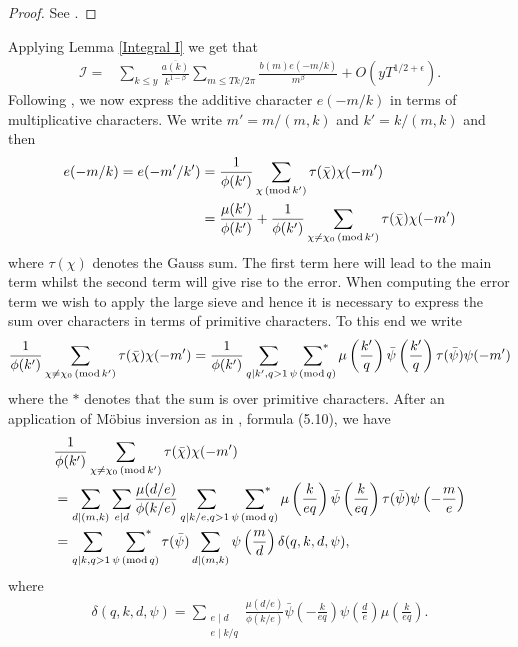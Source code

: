\documentclass[oneside, 12pt]{amsart}
\theoremstyle{definition}
\renewcommand{\pmod}[1]{\,(\textup{mod}\,#1)}
\newcommand{\mc}{\mathcal}
\newcommand{\ol}{\overline}
\newcommand{\leqs}{\leqslant }
\newcommand{\be}{\begin{equation*}}
\newcommand{\ee}{\end{equation*} }
\begin{document}
\begin{proof}
	 See \cite[Lemma 2]{CGGSimple}.
\end{proof}
Applying Lemma \ref{Integral I} we get that 
\be
\begin{split}
\mc{I} = & \sum_{k\leqs y}\frac{\ol{a(k)}}{k^{1-\beta}}\sum_{m\leqs Tk/2\pi}\frac{b(m)e(-m/k)}{m^\beta}
                +O(yT^{1/2+\epsilon}).
\end{split}
\ee
Following \cite{CGGSimple}, we now express the additive character $e(-m/k)$ in terms of multiplicative characters. We write $m'=m/(m,k)$ and $k'=k/(m,k)$ and then
\begin{align*}
e(-m/k)=e(-m'/k')&=\frac{1}{\phi(k')}\sum_{\chi \pmod {k'}}\tau(\bar{\chi})\chi(-m'	)\\&=\frac{\mu(k')}{\phi(k')}+ \frac{1}{\phi(k')}\sum_{\chi \not=\chi_0\pmod {k'}}\tau(\bar{\chi})\chi(-m')
\end{align*} 
where $\tau(\chi)$ denotes the Gauss sum. 
The first term here will lead to the main term whilst the second term will give rise to the error. When computing the error term we wish to apply the large sieve and hence it is necessary to express the sum over characters in terms of primitive characters.
To this end we write 
\begin{align*}
\frac{1}{\phi(k')}\sum_{\chi \not =\chi_0\pmod {k'}}\tau(\bar{\chi})\chi(-m')
=
\frac{1}{\phi(k')}\sum_{q\mid k', q>1\,\,} \sideset{}{^*}\sum_{\psi \pmod q}\mu\left( \frac{k'}{q}\right)\bar{\psi}\left(\frac{k'}{q}\right)\tau(\bar{\psi})\psi(-m')
\end{align*}
where the $*$ denotes that the sum is over primitive characters. After an application of M\"obius inversion as in \cite{CGGSimple}, formula (5.10), we have 
\begin{align*}
&\frac{1}{\phi(k')}\sum_{\chi \not =\chi_0\pmod {k'}}\tau(\bar{\chi})\chi(-m')\\&=\sum_{d\mid (m,k)}\sum_{e\mid d}\frac{\mu(d/e)}{\phi(k/e)}\sum_{q\mid k/e, q>1\,\,}
\sideset{}{^*}\sum_{\psi \pmod q}\mu\left( \frac{k}{eq}\right)\bar{\psi}\left( \frac{k}{eq}\right)\tau(\bar{\psi})\psi\left( -\frac{m}{e}\right)\\
&=\sum_{q\mid k , q>1\,\,} \sideset{}{^*}\sum_{\psi \pmod q}\tau(\bar{\psi})\sum_{d\mid (m,k)}\psi\left( \frac{m}{d}\right)\delta(q, k, d, \psi),
\end{align*}
where 
\begin{align*}
\delta(q, k, d, \psi)=\sum_{\substack{e\mid d\\ e\mid k/q}}\frac{\mu(d/e)}{\phi(k/e)}\bar{\psi}\left(- \frac{k}{eq}\right)\psi\left( \frac{d}{e}\right)\mu\left( \frac{k}{eq}\right).
\end{align*}
\end{document}
